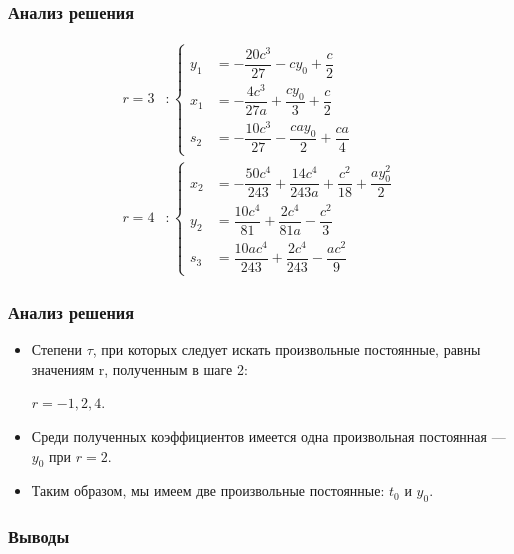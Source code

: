 \documentclass[hyperref={pdftex,unicode}]{beamer}
\begin{document}
\begin{frame}

\frametitle{Анализ решения}

$$
\begin{aligned}
r = 3 &:
\left\{
	\begin{aligned}
		y_1 &= -\dfrac{20c^3}{27} - cy_0 + \dfrac{c}{2} \\
		x_1 &= -\dfrac{4c^3}{27a} + \dfrac{cy_0}{3} + \dfrac{c}{2} \\
		s_2 &= -\dfrac{10c^3}{27} - \dfrac{cay_0}{2} + \dfrac{ca}{4}
	\end{aligned}
\right.
\\
r = 4 &: 
\left\{
	\begin{aligned}
		x_2 &= -\dfrac{50c^4}{243} + \dfrac{14c^4}{243a} + \dfrac{c^2}{18} + \dfrac{ay^2_0}{2}\\
		y_2 &= \dfrac{10c^4}{81} + \dfrac{2c^4}{81a} - \dfrac{c^2}{3} \\
		s_3 &= \dfrac{10ac^4}{243} + \dfrac{2c^4}{243} - \dfrac{ac^2}{9}
	\end{aligned}
\right.
\end{aligned}
$$

\end{frame}



\begin{frame}

\frametitle{Анализ решения}

\begin{itemize}

\item{}
Степени $ \tau $, при которых следует искать произвольные постоянные, равны значениям r, полученным в шаге 2: 
\begin{center}
$ r = -1, 2, 4. $ 
\end{center}

\item
Среди полученных коэффициентов имеется одна произвольная постоянная --- $ y_0 $ при $ r = 2 $.

\item
Таким образом, мы имеем две произвольные постоянные: $ t_0 $ и $ y_0 $.
\end{itemize}
\end{frame}


\begin{frame}

\frametitle{Выводы}



\end{frame}
\end{document}
